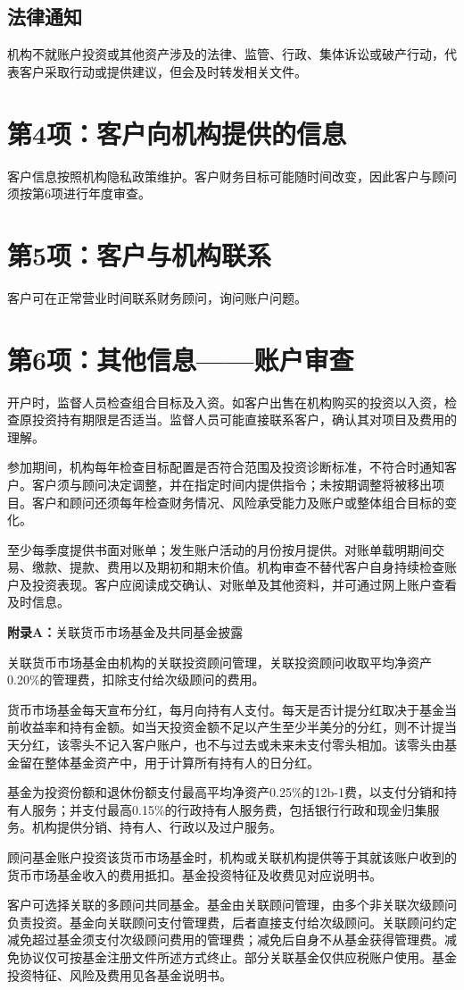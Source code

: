 \documentclass[UTF8,fontset=none,11pt,a4paper]{ctexart}
\begin{document}
\subsection*{法律通知}
机构不就账户投资或其他资产涉及的法律、监管、行政、集体诉讼或破产行动，代表客户采取行动或提供建议，但会及时转发\allowbreak\mbox{相关文件。}


\section*{第4项：客户向机构提供的信息}
客户信息按照机构隐私政策维护。客户财务目标可能随时间改变，因此客户与顾问须按第6项进行\allowbreak\mbox{年度审查。}


\section*{第5项：客户与机构联系}
客户可在正常营业时间联系财务顾问，询问\allowbreak\mbox{账户问题。}


\section*{第6项：其他信息——账户审查}
开户时，监督人员检查组合目标及入资。如客户出售在机构购买的投资以入资，检查原投资持有期限是否适当。监督人员可能直接联系客户，确认其对项目及费\allowbreak\mbox{用的理解。}


参加期间，机构每年检查目标配置是否符合范围及投资诊断标准，不符合时通知客户。客户须与顾问决定调整，并在指定时间内提供指令；未按期调整将被移出项目。客户和顾问还须每年检查财务情况、风险承受能力及账户或整体组合目\allowbreak\mbox{标的变化。}


至少每季度提供书面对账单；发生账户活动的月份按月提供。对账单载明期间交易、缴款、提款、费用以及期初和期末价值。机构审查不替代客户自身持续检查账户及投资表现。客户应阅读成交确认、对账单及其他资料，并可通过网上账户查看\allowbreak\mbox{及时信息。}


\textbf{附录A：}关联货币市场基金及共同\allowbreak\mbox{基金披露}


关联货币市场基金由机构的关联投资顾问管理，关联投资顾问收取平均净资产0.20\%的管理费，扣除支付给次级顾\allowbreak\mbox{问的费用。}


货币市场基金每天宣布分红，每月向持有人支付。每天是否计提分红取决于基金当前收益率和持有金额。如当天投资金额不足以产生至少半美分的分红，则不计提当天分红，该零头不记入客户账户，也不与过去或未来未支付零头相加。该零头由基金留在整体基金资产中，用于计算所有持有人\allowbreak\mbox{的日分红。}


基金为投资份额和退休份额支付最高平均净资产0.25\%的12b-1费，以支付分销和持有人服务；并支付最高0.15\%的行政持有人服务费，包括银行行政和现金归集服务。机构提供分销、持有人、行政以及\allowbreak\mbox{过户服务。}


顾问基金账户投资该货币市场基金时，机构或关联机构提供等于其就该账户收到的货币市场基金收入的费用抵扣。基金投资特征及收费见对\allowbreak\mbox{应说明书。}


客户可选择关联的多顾问共同基金。基金由关联顾问管理，由多个非关联次级顾问负责投资。基金向关联顾问支付管理费，后者直接支付给次级顾问。关联顾问约定减免超过基金须支付次级顾问费用的管理费；减免后自身不从基金获得管理费。减免协议仅可按基金注册文件所述方式终止。部分关联基金仅供应税账户使用。基金投资特征、风险及费用见各基\allowbreak\mbox{金说明书。}
\end{document}
